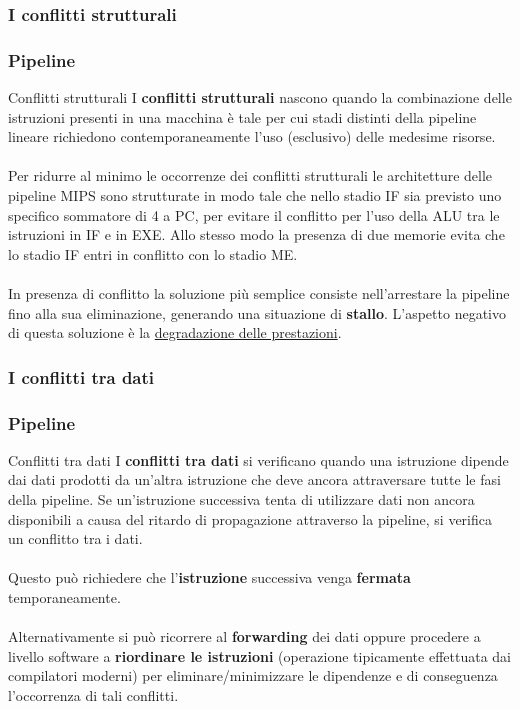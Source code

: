 \subsubsection[I conflitti strutturali]{I conflitti strutturali}
\begin{frame}
	\frametitle{ Pipeline}

	\begin{block}{Conflitti strutturali}
		I \textbf{conflitti strutturali} nascono quando la combinazione delle istruzioni presenti in una macchina è tale per cui stadi distinti della pipeline lineare richiedono contemporaneamente l’uso (esclusivo) delle medesime risorse.\\~\\
		Per ridurre al minimo le occorrenze dei conflitti strutturali le architetture delle pipeline MIPS sono strutturate in modo tale che nello stadio IF sia previsto uno specifico sommatore di 4 a PC, per evitare il conflitto per l’uso della ALU tra le istruzioni in IF e in EXE. Allo stesso modo la presenza di due memorie evita che lo stadio IF entri in conflitto con lo stadio ME.\\~\\
		In presenza di conflitto la soluzione più semplice consiste nell’arrestare la pipeline fino alla sua eliminazione, generando una situazione di \textbf{stallo}. L’aspetto negativo di questa soluzione è la \underline{degradazione delle prestazioni}.
	\end{block}
\end{frame}


\subsubsection[I conflitti tra dati]{I conflitti tra dati}
\begin{frame}
	\frametitle{ Pipeline}

	\begin{block}{Conflitti tra dati}
		I \textbf{conflitti tra dati} si verificano quando una istruzione dipende dai dati prodotti da un'altra istruzione che deve ancora attraversare tutte le fasi della pipeline. Se un'istruzione successiva tenta di utilizzare dati non ancora disponibili a causa del ritardo di propagazione attraverso la pipeline, si verifica un conflitto tra i dati.\\~\\
		Questo può richiedere che l'\textbf{istruzione} successiva venga \textbf{fermata} temporaneamente.\\~\\
		Alternativamente si può ricorrere al \textbf{forwarding} dei dati oppure procedere a livello software a \textbf{riordinare le istruzioni} (operazione tipicamente effettuata dai compilatori moderni) per eliminare/minimizzare le dipendenze e di conseguenza l'occorrenza di tali conflitti.
	\end{block}
\end{frame}


